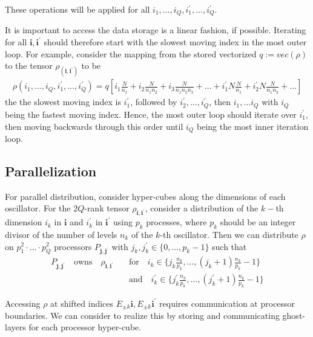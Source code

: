 \documentclass[letterpaper]{article}
\newcommand{\bfi}{\boldsymbol{i}}
\newcommand{\bfj}{\boldsymbol{j}}
\newcommand{\p}{\prime}
\begin{document}
  These operations will be applied for all $i_1,\dots, i_Q, i_1^\prime, \dots, i_Q^\prime$. 
  
  It is important to access the data storage is a linear fashion, if possible. Iterating for all $\bfi, \bfi^\prime$ should therefore start with the slowest moving index in the most outer loop. For example, consider the mapping from the stored vectorized $q := vec(\rho)$ to the tensor $\rho_(\bfi,\bfi^\prime)$ to be
    \begin{align}
        \rho(i_1,\dots,i_Q,i_1^\prime,\dots,i_Q^\prime) = q[i_1 \frac{N}{n_1} + i_2\frac{N}{n_1n_2} + i_3\frac{N}{n_1n_2n_3} + \dots + i_1^\prime N\frac{N}{n_1} + i_2^\prime N\frac{N}{n_1n_2} + \dots]
    \end{align}
  the the slowest moving index is $i_1^\prime$, followed by $i_2^\prime, \dots, i_Q^\prime$, then $i_1, \dots i_Q$ with $i_Q$ being the fastest moving index. Hence, the most outer loop should iterate over $i_1^\prime$, then moving backwards through this order until $i_Q$ being the most inner iteration loop.

 \subsection{Parallelization} 
 
 For parallel distribution, consider hyper-cubes along the dimensions of each oscillator. For the $2Q$-rank tensor $\rho_{\bfi, \bfi^\p}$, consider a distribution of the $k-$th dimension $i_k$ in $\bfi$ and $i_k^\p$ in $\bfi^\p$ using $p_k$ processes, where $p_k$ should be an integer divisor of the number of levels $n_k$ of the $k$-th oscillator. Then we can distribute $\rho$ on $p_1^2\cdot \ldots \cdot p_Q^2$ processors $P_{\bfj, \bfj^\p}$ with $j_k, j_k^\p \in \{0,\dots,p_k-1\}$ such that
 \begin{align}
   P_{\bfj, \bfj^\p} \quad \text{owns} \quad \rho_{\bfi, \bfi^\p} \quad &\text{for} \quad i_k \in \{ j_k \frac{n_k}{p_k}, \dots, \left(j_k+1\right) \frac{n_k}{p_k} - 1 \}\\
    &\text{and} \quad i_k^\p \in \{ j_k^\p \frac{n_k}{p_k}, \dots, \left(j_k^\p+1\right) \frac{n_k}{p_k} - 1 \}
 \end{align}

 Accessing $\rho$ at shifted indices $E_{\pm k}\bfi, E_{\pm k}\bfi^\p$ requires communication at processor boundaries. We can consider to realize this by storing and communicating ghost-layers for each processor hyper-cube.
\end{document}
